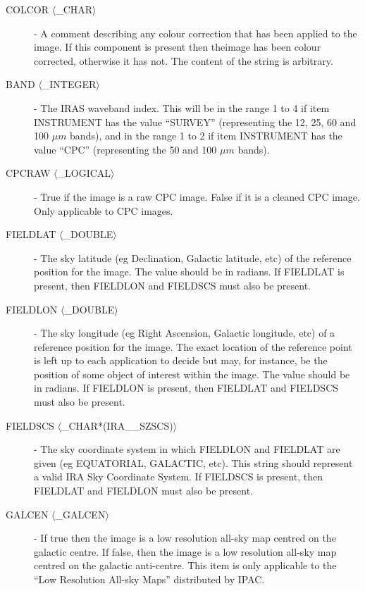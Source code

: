 \begin{description}

\item [COLCOR $\langle$\_CHAR$\rangle$] - A comment describing any colour 
correction that has been applied to the image. If this component is present then 
theimage has been colour corrected, otherwise it has not. The content of the 
string is arbitrary.

\item [BAND $\langle$\_INTEGER$\rangle$] - The IRAS waveband index. This will be in the range 1
to 4 if item INSTRUMENT has the value ``SURVEY'' (representing the 12, 25, 60
and 100 $\mu m$ bands), and in the range 1 to 2 if item INSTRUMENT has the value
``CPC'' (representing the 50 and 100 $\mu m$ bands). 

\item [CPCRAW $\langle$\_LOGICAL$\rangle$] - True if the image is a raw CPC image. False if it
is a cleaned CPC image. Only applicable to CPC images. 

\item [FIELDLAT $\langle$\_DOUBLE$\rangle$] - The sky latitude (eg Declination, Galactic
latitude, etc) of the reference position for the image. The value should be in
radians. If FIELDLAT is present, then FIELDLON and FIELDSCS must also be
present. 

\item [FIELDLON $\langle$\_DOUBLE$\rangle$] - The sky longitude (eg Right Ascension, Galactic
longitude, etc) of a reference position for the image. The exact location of the
reference point is left up to each application to decide but may, for instance,
be the position of some object of interest within the image. The value should be
in radians. If FIELDLON is present, then FIELDLAT and FIELDSCS must also be
present. 

\item [FIELDSCS $\langle$\_CHAR*(IRA\_\_SZSCS)$\rangle$] - The sky coordinate system in which
FIELDLON and FIELDLAT are given (eg EQUATORIAL, GALACTIC, etc). This string
should represent a valid IRA Sky Coordinate System. If FIELDSCS is present, then
FIELDLAT and FIELDLON must also be present. 

\item [GALCEN $\langle$\_GALCEN$\rangle$] - If true then the image is a low resolution all-sky
map centred on the galactic centre. If false, then the image is a low resolution
all-sky map centred on the galactic anti-centre. This item is only applicable to
the ``Low Resolution All-sky Maps'' distributed by IPAC. 


\end{description}
